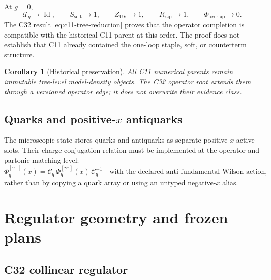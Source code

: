 \documentclass[11pt]{article}
\newtheorem{corollary}[definition]{Corollary}
\newcommand{\Id}{\operatorname{Id}}
\newcommand{\cC}{\mathcal C}
\newcommand{\cU}{\mathcal U}
\newcommand{\Soft}{\ensuremath{\mathrm{soft}}}
\begin{document}
At \(g=0\),
\begin{equation}
 \cU_{\eta}\to\Id,
 \qquad
 S_{\Soft}\to1,
 \qquad
 Z_{\mathrm{UV}}\to1,
 \qquad
 R_{\mathrm{rap}}\to1,
 \qquad
 \Phi_{\mathrm{overlap}}\to0.
 \label{eq:tree-factors}
\end{equation}
The C32 result \eqref{eq:c11-tree-reduction} proves that the operator completion is compatible with the historical C11 parent at this order.  The proof does not establish that C11 already contained the one-loop staple, soft, or counterterm structure.

\begin{corollary}[Historical preservation]
All C11 numerical parents remain immutable tree-level model-density objects.  The C32 operator root extends them through a versioned operator edge; it does not overwrite their evidence class.
\end{corollary}

\subsection{Quarks and positive-\texorpdfstring{\(x\)}{x} antiquarks}

The microscopic state stores quarks and antiquarks as separate positive-\(x\) active slots.  Their charge-conjugation relation must be implemented at the operator and partonic matching level:
\begin{equation}
 \Phi_{\bar q}^{[\gamma^+]}(x)
 =
 \cC_q\,
 \Phi_q^{[\gamma^+]}(x)\,
 \cC_q^{-1}
 \quad\text{with the declared anti-fundamental Wilson action},
 \label{eq:charge-conjugation}
\end{equation}
rather than by copying a quark array or using an untyped negative-\(x\) alias.

\section{Regulator geometry and frozen plans}
\label{sec:regulators}

\subsection{C32 collinear regulator}
\end{document}
